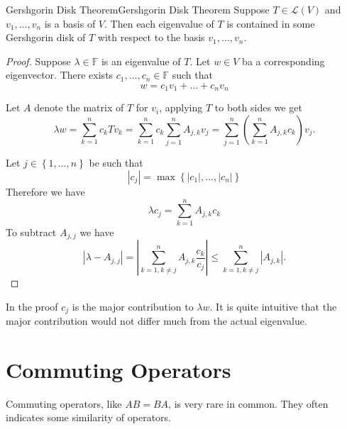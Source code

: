 \documentclass[../main.tex]{subfiles}
\begin{document}
\begin{theorem}{Gershgorin Disk Theorem}{Gershgorin Disk Theorem}
Suppose $T\in \mathscr{L}(V)$ and $v_1, \ldots ,v_n$ is a basis of $V$. Then each eigenvalue of $T$ is contained in some Gershgorin disk of $T$ with respect to the basis $v_1, \ldots ,v_n$.
\end{theorem}
\begin{proof}
Suppose $\lambda \in \mathbb{F}$ is an eigenvalue of $T$. Let $w\in V$ ba a corresponding eigenvector. There exists $c_1, \ldots ,c_n\in \mathbb{F}$ such that
\begin{equation*}
w=c_1v_1+\ldots +c_nv_n
\end{equation*}

Let $A$ denote the matrix of $T$ for $v_i$, applying $T$ to both sides we get
\begin{equation*}
	\lambda w = \sum_{k=1}^{n} c_k Tv_k = \sum_{k=1}^{n} c_k \sum_{j=1}^{n} A_{j,k}v_j =\sum_{j=1}^{n} \left(\sum_{k=1}^{n} A_{j,k}c_k\right)v_j.
\end{equation*}

Let $j\in \left\{ 1, \ldots ,n \right\}$ be such that
\begin{equation*}
\left|c_j\right| = \max \left\{ \left|c_1\right|, \ldots ,\left|c_n\right| \right\}
\end{equation*}
Therefore we have
\begin{equation*}
\lambda c_j = \sum_{k=1}^{n} A_{j,k}c_k
\end{equation*}
To subtract $A_{j,j}$ we have
\begin{equation*}
\left|\lambda-A_{j,j}\right| = \left|\sum_{k=1,k\neq j}^{n} A_{j,k}\frac{c_k}{c_j}\right| \leq \sum_{k=1,k\neq j}^{n} \left|A_{j,k}\right|.
\end{equation*}
\end{proof}
In the proof $c_j$ is the major contribution to $\lambda w$. It is quite intuitive that the major contribution would not differ much from the actual eigenvalue.


\section{Commuting Operators}

Commuting operators, like $AB=BA$, is very rare in common. They often indicates some similarity of operators.
\end{document}
